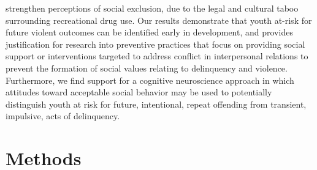 \documentclass[utf8]{article}
\begin{document}
strengthen perceptions of social exclusion, due to the legal and cultural taboo surrounding recreational drug use. Our results demonstrate that youth at-risk for future violent outcomes can be identified early in development, and provides justification for research into preventive practices that focus on providing social support or interventions targeted to address conflict in interpersonal relations to prevent the formation of social values relating to delinquency and violence. Furthermore, we find support for a cognitive neuroscience approach in which attitudes toward acceptable social behavior may be used to potentially distinguish youth at risk for future, intentional, repeat offending from transient, impulsive, acts of delinquency.
\section*{Methods}
\end{document}
